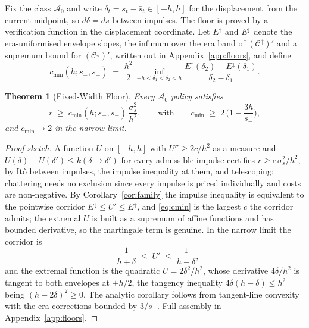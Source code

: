 \documentclass[11pt,a4paper]{article}
\theoremstyle{definition}
\theoremstyle{plain}
\newtheorem{theorem}{Theorem}
\theoremstyle{remark}
\begin{document}
Fix the class $\mathcal{A}_0$ and write $\delta_t = s_t - \bar s_t\in [-h, h]$ for the displacement from the current midpoint, so
$d\delta = ds$ between impulses. The floor is proved by a verification function in the displacement coordinate. Let $E^{\uparrow}$ and
$E^{\downarrow}$ denote the era-uniformised envelope slopes, the infimum over the era band of
$(\mathcal{C}^{\uparrow})'$ and a supremum bound for $(\mathcal{C}^{\downarrow})'$, written out in Appendix~\ref{app:floors}, and define
\begin{equation}\label{eq:cmin}
c_{\min}(h; s_-, s_+) \;=\; \frac{h^2}{2}\,
\inf_{-h < \delta_1 < \delta_2 < h}
\frac{E^{\uparrow}(\delta_2) -
E^{\downarrow}(\delta_1)}{\delta_2 - \delta_1}.
\end{equation}

\begin{theorem}[Fixed-Width Floor]\label{thm:fixed}
Every $\mathcal{A}_0$ policy satisfies
\begin{equation}\label{eq:fixedfloor}
r \;\ge\; c_{\min}(h; s_-, s_+)\, \frac{\sigma_s^2}{h^2},
\qquad\text{with}\qquad
c_{\min} \;\ge\; 2\,\Big(1 - \frac{3h}{s_-}\Big),
\end{equation}
and $c_{\min} \to 2$ in the narrow limit.
\end{theorem}

\begin{proof}[Proof sketch]
A function $U$ on $[-h, h]$ with $U'' \ge 2c/h^2$ as a measure and $U(\delta) - U(\delta') \le k(\delta \to \delta')$ for every admissible impulse certifies $r \ge c\,\sigma_s^2/h^2$, by It\^o
between impulses, the impulse inequality at them, and telescoping; chattering needs no exclusion since every impulse is priced individually and costs are non-negative. By Corollary~\ref{cor:family} 
the impulse inequality is equivalent to the pointwise corridor $E^{\downarrow} \le U'\le E^{\uparrow}$, and \eqref{eq:cmin} is the largest $c$ the corridor admits; the extremal $U$ is built as a
supremum of affine functions and has bounded derivative, so the martingale term is genuine. In the narrow limit the corridor is
\[
-\frac{1}{h+\delta} \;\le\; U' \;\le\; \frac{1}{h-\delta},
\]
and the extremal function is the quadratic $U = 2\delta^2/h^2$, whose derivative $4\delta/h^2$ is tangent to both envelopes at $\pm h/2$, the tangency inequality
$4\delta(h - \delta) \le h^2$ being $(h - 2\delta)^2 \ge 0$. The analytic corollary follows from tangent-line convexity with the era corrections bounded by $3/s_-$. Full assembly in Appendix~\ref{app:floors}.
\end{proof}
\end{document}
